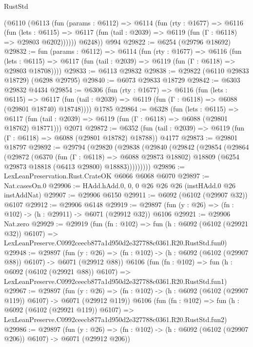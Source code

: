 \begin{lexlean}{RustStd}
\begin{coremodule}
      (@6110
        (@6113
          (fun (params : @6112) =>
          @6114
            (fun (rty : @1677) =>
            @6116
              (fun (lets : @6115) =>
              @6117 (fun (tail : @2039) => @6119 (fun (Γ : @6118) => @29803 @6202))))))
        @6248))
    @994
@29822 := @6254 (@29796 @18692)
@29832 := fun (params : @6112) =>
  @6114
    (fun (rty : @1677) =>
    @6116
      (fun (lets : @6115) =>
      @6117 (fun (tail : @2039) => @6119 (fun (Γ : @6118) => @29803 @18708))))
@29833 := @6113 @29832
@29838 := @29822 (@6110 @29833 @18729) (@6298 @29795)
@29840 := @6073 @29833 @18729
@29842 := @6303 @29832 @4434
@29854 := @6306
    (fun (rty : @1677) =>
    @6116
      (fun (lets : @6115) =>
      @6117 (fun (tail : @2039) => @6119 (fun (Γ : @6118) => @6088 (@29801 @18740) @18748))))
    @1785
@29864 := @6328
    (fun (lets : @6115) =>
    @6117 (fun (tail : @2039) => @6119 (fun (Γ : @6118) => @6088 (@29801 @18762) @18771)))
    @2071
@29872 := @6352
    (fun (tail : @2039) => @6119 (fun (Γ : @6118) => @6088 (@29801 @18782) @18788))
    @4177
@29873 := @29801 @18797
@29892 := @29794
    (@29820
      (@29838
        (@29840
          (@29842
            (@29854
              (@29864
                (@29872
                  (@6370
                    (fun (Γ : @6118) => @6088 @29873 @18802)
                    @18809
                    (@6254 @29873 @18818 (@6413 @29800) @18883)))))))))
@29896 := LexLeanPreservation.Rust.CrateOK @6066 @6068 @6070
@29897 := Nat.casesOn.{0}
@29906 := HAdd.hAdd.{0, 0, 0} @26 @26 @26 (instHAdd.{0} @26 instAddNat)
@29907 := @29906 @6150
@29911 := @6092 (@6102 (@29907 @32)) @6107
@29912 := @29906 @6148
@29919 := @29897 (fun (y : @26) => (fn : @102) -> (h : @29911) -> @6071 (@29912 @32)) @6106
@29921 := @29906 Nat.zero
@29929 := @29919
    (fun (fn : @102) =>
    fun (h : @6092 (@6102 (@29921 @32)) @6107) =>
    LexLeanPreserve.C0992ceecb877a1d950d2e327788c0361.R20.RustStd.fun0)
@29948 := @29897
    (fun (y : @26) => (fn : @102) -> (h : @6092 (@6102 (@29907 @88)) @6107) -> @6071 (@29912 @88))
    @6106
    (fun (fn : @102) =>
    fun (h : @6092 (@6102 (@29921 @88)) @6107) =>
    LexLeanPreserve.C0992ceecb877a1d950d2e327788c0361.R20.RustStd.fun1)
@29967 := @29897
    (fun (y : @26) => (fn : @102) -> (h : @6092 (@6102 (@29907 @119)) @6107) -> @6071 (@29912 @119))
    @6106
    (fun (fn : @102) =>
    fun (h : @6092 (@6102 (@29921 @119)) @6107) =>
    LexLeanPreserve.C0992ceecb877a1d950d2e327788c0361.R20.RustStd.fun2)
@29986 := @29897
    (fun (y : @26) => (fn : @102) -> (h : @6092 (@6102 (@29907 @206)) @6107) -> @6071 (@29912 @206))

\end{coremodule}
\end{lexlean}
